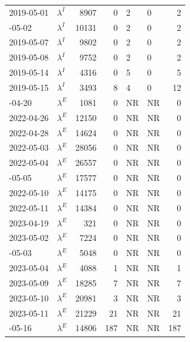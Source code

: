 \documentclass[
]{article}
\begin{document}
\begin{longtable}{llrrllr}
2019-05-01 & $\lambda^I$ & 8907 & 0 & 2 & 0 & 2\\
\addlinespace
2019-05-02 & $\lambda^I$ & 10131 & 0 & 2 & 0 & 2\\
2019-05-07 & $\lambda^I$ & 9802 & 0 & 2 & 0 & 2\\
2019-05-08 & $\lambda^I$ & 9752 & 0 & 2 & 0 & 2\\
2019-05-14 & $\lambda^I$ & 4316 & 0 & 5 & 0 & 5\\
2019-05-15 & $\lambda^I$ & 3493 & 8 & 4 & 0 & 12\\
\addlinespace
2022-04-20 & $\lambda^E$ & 1081 & 0 & NR & NR & 0\\
2022-04-26 & $\lambda^E$ & 12150 & 0 & NR & NR & 0\\
2022-04-28 & $\lambda^E$ & 14624 & 0 & NR & NR & 0\\
2022-05-03 & $\lambda^E$ & 28056 & 0 & NR & NR & 0\\
2022-05-04 & $\lambda^E$ & 26557 & 0 & NR & NR & 0\\
\addlinespace
2022-05-05 & $\lambda^E$ & 17577 & 0 & NR & NR & 0\\
2022-05-10 & $\lambda^E$ & 14175 & 0 & NR & NR & 0\\
2022-05-11 & $\lambda^E$ & 14384 & 0 & NR & NR & 0\\
2023-04-19 & $\lambda^E$ & 321 & 0 & NR & NR & 0\\
2023-05-02 & $\lambda^E$ & 7224 & 0 & NR & NR & 0\\
\addlinespace
2023-05-03 & $\lambda^E$ & 5048 & 0 & NR & NR & 0\\
2023-05-04 & $\lambda^E$ & 4088 & 1 & NR & NR & 1\\
2023-05-09 & $\lambda^E$ & 18285 & 7 & NR & NR & 7\\
2023-05-10 & $\lambda^E$ & 20981 & 3 & NR & NR & 3\\
2023-05-11 & $\lambda^E$ & 21229 & 21 & NR & NR & 21\\
\addlinespace
2023-05-16 & $\lambda^E$ & 14806 & 187 & NR & NR & 187\\
\bottomrule
\end{longtable}

\newpage
\end{document}
